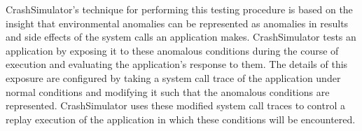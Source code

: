 CrashSimulator's technique for performing this testing procedure is based on the
insight that environmental anomalies can be represented as anomalies in results
and side effects of the system calls an application makes.  CrashSimulator tests
an application by exposing it to these anomalous conditions during the course of
execution and evaluating the application's response to them.  The details of
this exposure are configured by taking a system call trace of the application
under normal conditions and modifying it such that the anomalous conditions are
represented.  CrashSimulator uses these modified system call traces to control a
replay execution of the application in which these conditions will be encountered.





